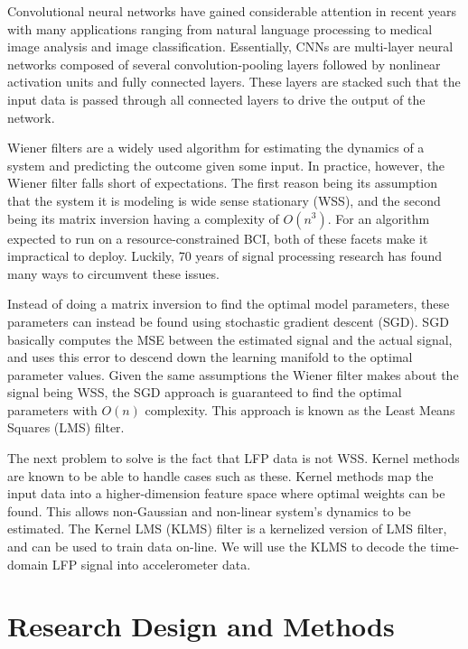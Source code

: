 \documentclass[12pt]{article}
\begin{document}
Convolutional neural networks have gained considerable attention in recent years with many applications ranging from natural language processing to medical image analysis and image classification. Essentially, CNNs are multi-layer neural networks composed of several convolution-pooling layers followed by nonlinear activation units and fully connected layers.
These layers are stacked such that the input data is passed through all connected layers to drive the output of the network. 
 \cite{krizhevsky2017}

Wiener filters are a widely used algorithm for estimating the dynamics of a system and predicting the outcome given some input. In practice, however, the Wiener filter falls short of expectations. The first reason being its assumption that the system it is modeling is wide sense stationary (WSS), and the second being its matrix inversion having a complexity of $O(n^3)$. For an algorithm expected to run on a resource-constrained BCI, both of these facets make it impractical to deploy. Luckily, 70 years of signal processing research has found many ways to circumvent these issues. \cite{li2012}

Instead of doing a matrix inversion to find the optimal model parameters, these parameters can instead be found using stochastic gradient descent (SGD). SGD basically computes the MSE between the estimated signal and the actual signal, and uses this error to descend down the learning manifold to the optimal parameter values. Given the same assumptions the Wiener filter makes about the signal being WSS, the SGD approach is guaranteed to find the optimal parameters with $O(n)$ complexity. This approach is known as the Least Means Squares (LMS) filter. \cite{li2012}

The next problem to solve is the fact that LFP data is not WSS. Kernel methods are known to be able to handle cases such as these. Kernel methods map the input data into a higher-dimension feature space where optimal weights can be found. This allows non-Gaussian and non-linear system’s dynamics to be estimated. The Kernel LMS (KLMS) filter is a kernelized version of LMS filter, and can be used to train data on-line. We will use the KLMS to decode the time-domain LFP signal into accelerometer data. \cite{li2012}


\section{Research Design and Methods}
\end{document}
